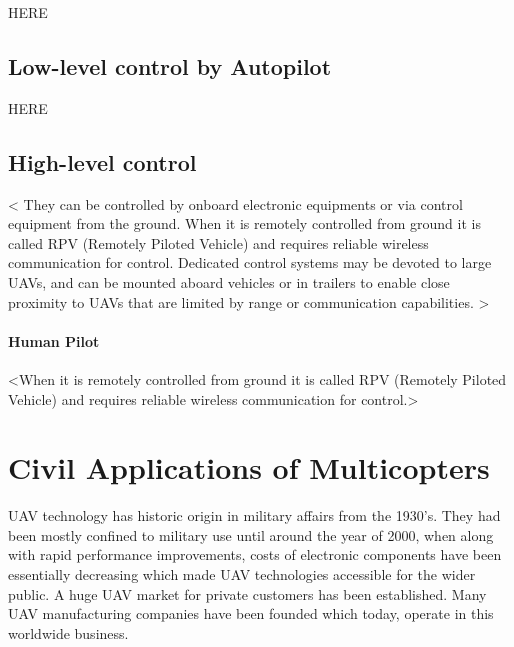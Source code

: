 HERE

\subsection{Low-level control by Autopilot}

HERE

\subsection{High-level control}

<
They can be controlled by onboard electronic equipments 
or via control equipment from the ground. 
When it is remotely controlled from ground 
it is called RPV (Remotely Piloted Vehicle) 
and requires reliable wireless communication for control. 
Dedicated control systems may be devoted to large UAVs, 
and can be mounted aboard vehicles or in trailers 
to enable close proximity to UAVs that are 
limited by range or communication capabilities.
>


\paragraph{Human Pilot}
<When it is remotely controlled from ground 
it is called RPV (Remotely Piloted Vehicle) 
and requires reliable wireless communication for control.>







\section{Civil Applications of Multicopters}

UAV technology has historic origin
in military
affairs from the 1930's.
They had been mostly confined to military use
until around the year of 2000,
when along with
rapid performance improvements,
costs of electronic components
have been essentially decreasing 
which made UAV technologies 
accessible for the wider public.
A huge UAV market for private customers
has been established. Many UAV manufacturing
companies have been founded which today,
operate in this worldwide business.

